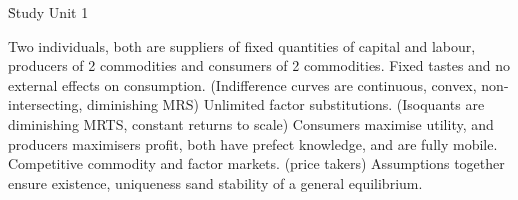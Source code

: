 \documentclass[12pt]{examnotes}
\begin{document}
\obeylines

\setlength\baselineskip{15pt}

\h{Study Unit 1}

\ra Two individuals, both are suppliers of fixed quantities of capital and labour, producers of 2 commodities and consumers of 2 commodities.
\ra Fixed tastes and no external effects on consumption. (Indifference curves are continuous, convex, non-intersecting, diminishing MRS)
\ra Unlimited factor substitutions. (Isoquants are diminishing MRTS, constant returns to scale)
\ra Consumers maximise utility, and producers maximisers profit, both have prefect knowledge, and are fully mobile. 
\ra Competitive commodity and factor markets. (price takers)
\ra Assumptions together ensure existence, uniqueness sand stability of a general equilibrium.
\end{document}
